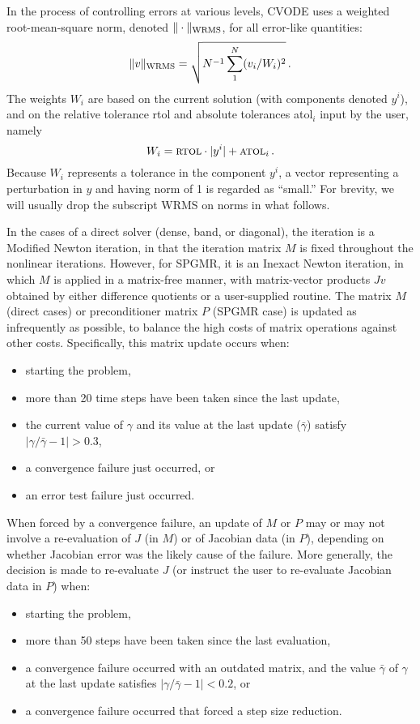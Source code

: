 In the process of controlling errors at various levels, CVODE uses a
weighted root-mean-square norm, denoted
$\|\cdot\|_{\mbox{\scriptsize WRMS}}$, for all
error-like quantities:
\begin{equation}\label{wrmsnorm}
 \|v\|_{\mbox{\scriptsize WRMS}} = \sqrt{N^{-1}\sum_1^N (v_i/W_i)^2}
 \, .
\end{equation}
The weights $W_i$ are based on the current solution (with components
denoted $y^i$), and on the relative tolerance {\sc rtol} and absolute
tolerances {\sc atol}$_i$ input by the user, namely
\begin{equation}\label{errwt}
 W_i = \mbox{\sc rtol} \cdot |y^i| + \mbox{\sc atol}_i \, .
\end{equation}
Because $W_i$ represents a tolerance in the component $y^i$, a vector
representing a perturbation in $y$ and having norm of 1 is regarded as
``small.''  For brevity, we will usually drop the subscript WRMS on
norms in what follows.

In the cases of a direct solver (dense, band, or diagonal), the
iteration is a Modified Newton iteration, in that the iteration matrix
$M$ is fixed throughout the nonlinear iterations.  However, for SPGMR,
it is an Inexact Newton iteration, in which $M$ is applied in a
matrix-free manner, with matrix-vector products $Jv$ obtained by
either difference quotients or a user-supplied routine.  The matrix
$M$ (direct cases) or preconditioner matrix $P$ (SPGMR case) is
updated as infrequently as possible, to balance the high costs of
matrix operations against other costs.  Specifically, this matrix
update occurs when:
\begin{itemize}
\item starting the problem,
\item more than 20 time steps have been taken since the last update,
\item the current value of $\gamma$ and its value at the last update
($\bar{\gamma}$) satisfy $|\gamma/\bar{\gamma} - 1| > 0.3$,
\item a convergence failure just occurred, or
\item an error test failure just occurred.
\end{itemize}
When forced by a convergence failure, an update of $M$ or $P$ may or
may not involve a re-evaluation of $J$ (in $M$) or of Jacobian data
(in $P$), depending on whether Jacobian error was the likely cause of
the failure.  More generally, the decision is made to re-evaluate $J$
(or instruct the user to re-evaluate Jacobian data in $P$) when:
\begin{itemize}
\item starting the problem,
\item more than 50 steps have been taken since the last evaluation,
\item a convergence failure occurred with an outdated matrix, and
the value $\bar{\gamma}$ of $\gamma$ at the last update
satisfies $|\gamma/\bar{\gamma} - 1| < 0.2$, or
\item a convergence failure occurred that forced a step size reduction.
\end{itemize}

